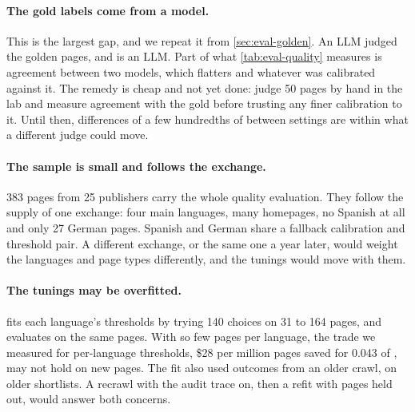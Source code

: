 \paragraph{The gold labels come from a model.} This is the largest gap, and we repeat it from \cref{sec:eval-golden}. An LLM judged the golden pages, and  is an LLM. Part of what \cref{tab:eval-quality} measures is agreement between two models, which flatters  and whatever was calibrated against it. The remedy is cheap and not yet done: judge 50 pages by hand in the lab and measure agreement with the gold before trusting any finer calibration to it. Until then, differences of a few hundredths of \hF{} between settings are within what a different judge could move.

\paragraph{The sample is small and follows the exchange.} 383 pages from 25 publishers carry the whole quality evaluation. They follow the supply of one exchange: four main languages, many homepages, no Spanish at all and only 27 German pages. Spanish and German share a fallback calibration and threshold pair. A different exchange, or the same one a year later, would weight the languages and page types differently, and the tunings would move with them.

\paragraph{The tunings may be overfitted.}  fits each language's thresholds by trying 140 choices on 31 to 164 pages, and evaluates on the same pages. With so few pages per language, the trade we measured for per-language thresholds, \$28 per million pages saved for 0.043 of \hF{}, may not hold on new pages. The fit also used  outcomes from an older crawl, on older shortlists. A recrawl with the audit trace on, then a refit with pages held out, would answer both concerns.

